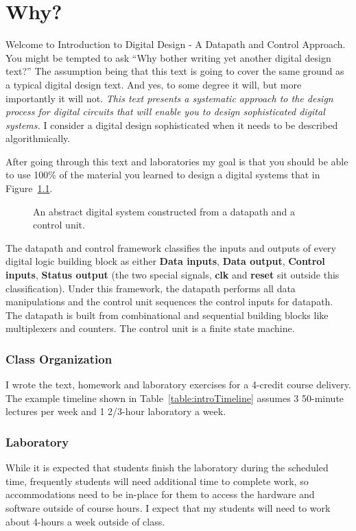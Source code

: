 \chapter{Why?}
\label{chapter:Introduction}
\graphicspath{ {./chapter00/Fig} }


Welcome to Introduction to Digital Design - A Datapath and Control Approach.  
You might be tempted to ask ``Why bother writing yet another digital design 
text?''  The assumption being that this text is going to cover the same ground as a 
typical digital design text.  And yes, to some  degree it will, but more importantly 
it will not.   \emph{This text presents a systematic approach to the design process for 
digital circuits that will enable you to design sophisticated digital systems.} I consider a
digital design sophisticated when it needs to be described algorithmically.

After going through this text and laboratories my goal is that you should be able to
use 100\% of the material you learned to design a digital systems that in 
Figure~\ref{fig:introAbstract}.

\begin{figure}[ht]
\caption{An abstract digital system constructed from a datapath and a control unit.}
\label{fig:introAbstract}
\end{figure}

The datapath and control framework classifies the inputs and outputs of every
digital logic building block as either \textbf{Data inputs}, \textbf{Data output}, \textbf{Control inputs}, 
\textbf{Status output} (the two special signals, \textbf{clk} and \textbf{reset} sit outside this
classification).  Under this framework, the datapath performs all data manipulations and the 
control unit sequences the control inputs for datapath.  The datapath is built from
combinational and sequential building blocks like multiplexers and counters.  The control unit
is a finite state machine.

\subsection{Class Organization}
 I wrote the text, homework and laboratory 
exercises for a 4-credit course delivery.  The example timeline shown in Table~\ref{table:introTimeline} assumes
3 50-minute lectures per week and 1 2/3-hour laboratory a week. 

\subsection{Laboratory}
While it is expected that students finish the laboratory
during the scheduled time, frequently students will need additional time to complete work, so accommodations need
to be in-place for them to access the hardware and software outside of course hours.   I expect that my students will 
need to work about 4-hours a week outside of class. 




